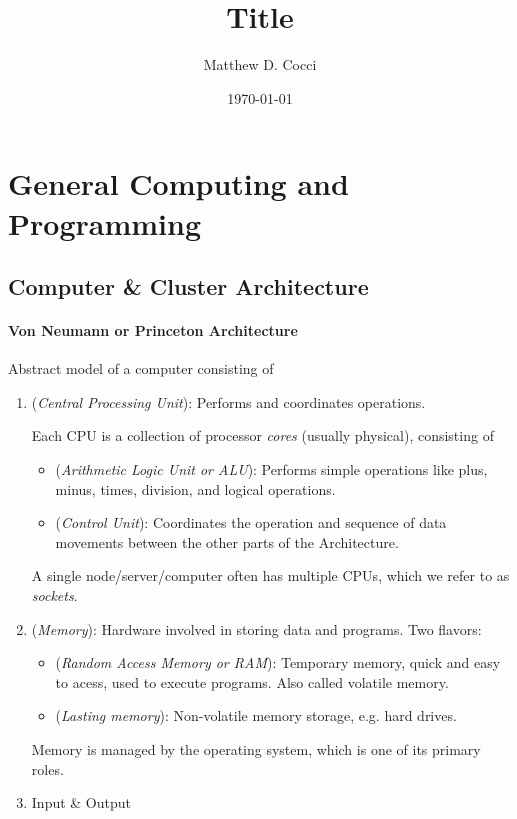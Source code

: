 \documentclass[12pt]{article}
\author{Matthew D. Cocci}
\title{Title}
\date{\today}
\theoremstyle{plain}
\theoremstyle{definition}
\theoremstyle{remark}
\begin{document}
\lstset{style=log}

\tableofcontents

\clearpage
\section{General Computing and Programming}

\subsection{Computer \& Cluster Architecture}


\paragraph{Von Neumann or Princeton Architecture}
Abstract model of a computer consisting of
\begin{enumerate}
  \item (\emph{Central Processing Unit}):
    Performs and coordinates operations.

    Each CPU is a collection of processor \emph{cores} (usually
    physical), consisting of
    \begin{itemize}
      \item (\emph{Arithmetic Logic Unit or ALU}): Performs simple
        operations like plus, minus, times, division, and logical
        operations.
      \item (\emph{Control Unit}): Coordinates the operation and
        sequence of data movements between the other parts of the
        Architecture.
    \end{itemize}
    A single node/server/computer often has multiple CPUs, which we refer to
    as \emph{sockets}.

  \item (\emph{Memory}):
    Hardware involved in storing data and programs.
    Two flavors:
    \begin{itemize}
      \item (\emph{Random Access Memory or RAM}):
        Temporary memory, quick and easy to acess, used to execute
        programs. Also called volatile memory.
      \item (\emph{Lasting memory}):
        Non-volatile memory storage, e.g. hard drives.
    \end{itemize}
    Memory is managed by the operating system, which is one of its
    primary roles.
  \item Input \& Output
\end{enumerate}
\end{document}

